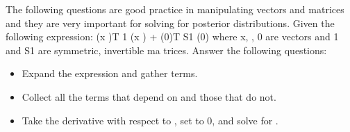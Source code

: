 \documentclass{../amsml}
\begin{document}

\begin{problem}
The following questions are good practice in manipulating vectors and matrices and they are very important for solving for posterior distributions.
Given the following expression:
(x )T 1 (x ) + (0)T S1 (0) 
where x, , 0 are vectors and 1 and S1 are symmetric, invertible ma trices.
Answer the following questions:

\begin{itemize}
	\item Expand the expression and gather terms.
	\item Collect all the terms that depend on  and those that do not.
	\item Take the derivative with respect to , set to 0, and solve for . %
\end{itemize}

\end{problem}
\end{document}
